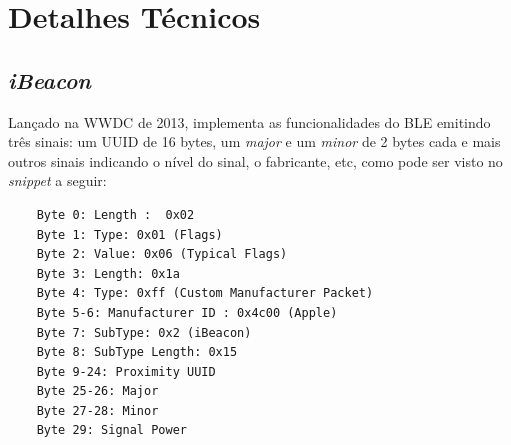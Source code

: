 \documentclass[
	12pt,				%
	openright,			%
	twoside,			%
	a4paper,			%
	english,			%
	french,				%
	spanish,			%
	brazil				%
	]{abntex2}
\begin{document}
\chapter{Detalhes Técnicos}

\section{\emph{iBeacon}}

Lançado na WWDC de 2013, implementa as funcionalidades do BLE emitindo três sinais: um UUID de 16 bytes, um \emph{major} e um \emph{minor} de 2 bytes cada e mais outros sinais indicando o nível do sinal, o fabricante, etc, como pode ser visto no \emph{snippet} a seguir:

\begin{verbatim}
    Byte 0: Length :  0x02
    Byte 1: Type: 0x01 (Flags)
    Byte 2: Value: 0x06 (Typical Flags)
    Byte 3: Length: 0x1a
    Byte 4: Type: 0xff (Custom Manufacturer Packet)
    Byte 5-6: Manufacturer ID : 0x4c00 (Apple)
    Byte 7: SubType: 0x2 (iBeacon)
    Byte 8: SubType Length: 0x15
    Byte 9-24: Proximity UUID
    Byte 25-26: Major
    Byte 27-28: Minor
    Byte 29: Signal Power
\end{verbatim}
\end{document}
